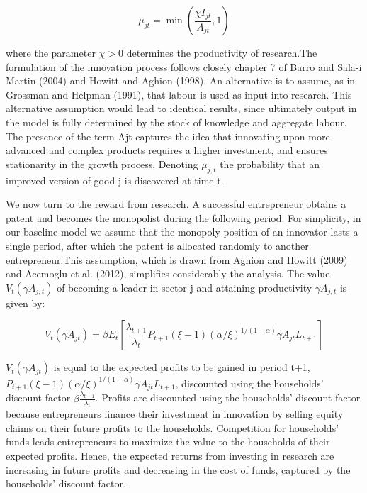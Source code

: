 \documentclass[10pt,math=newtx,citestyle=gb7714-2015,bibstyle=gb7714-2015]{elegantbook}
\begin{document}
{{{	\begin{equation}
		\mu_{j t}=\min \left(\frac{\chi I_{j t}}{A_{j t}}, 1\right)
	\end{equation}
	
	where the parameter $\chi>0$ determines the productivity of research.The formulation of the innovation process follows closely chapter 7 of Barro and Sala-i Martin (2004) and Howitt and Aghion (1998). An alternative is to assume, as in Grossman and Helpman (1991), that labour is used as input into research. This alternative assumption would lead to identical results, since ultimately output in the model is fully determined by the stock of knowledge and aggregate labour. The presence of the term Ajt captures the idea that innovating upon more advanced and complex products requires a higher investment, and ensures stationarity in the growth process. Denoting $\mu_{j,t}$ the probability that an improved version of good j is discovered at time t. 
	
	We now turn to the reward from research. A successful entrepreneur obtains a patent and becomes the monopolist during the following period. For simplicity, in our baseline model we assume that the monopoly position of an innovator lasts a single period, after which the patent is allocated randomly to another entrepreneur.This assumption, which is drawn from Aghion and Howitt (2009) and Acemoglu et al. (2012), simplifies considerably the analysis. The value $V_t (\gamma A_{j,t} )$ of becoming a leader in sector j and attaining productivity $\gamma A_{j,t}$ is given by:

\begin{equation}
	V_{t}\left(\gamma A_{j t}\right)=\beta E_{t}\left[\frac{\lambda_{t+1}}{\lambda_{t}} P_{t+1} (\xi-1)(\alpha / \xi)^{1 /(1-\alpha)} \gamma A_{j t} L_{t+1}\right]
\end{equation}

$V_{t}\left(\gamma A_{j t}\right)$ is equal to the expected profits to be gained in period t+1, $P_{t+1} (\xi-1)(\alpha / \xi)^{1 /(1-\alpha)} \gamma A_{j t} L_{t+1}$, discounted using the households’ discount factor $\beta \frac{\lambda_{t+1}}{\lambda_{t}}$. Profits are discounted using the households’ discount factor because entrepreneurs finance their investment in innovation by selling equity claims on their future profits to the households. Competition for households’ funds leads entrepreneurs to maximize the value to the households of their expected profits. Hence, the expected returns from investing in research are increasing in future profits and decreasing in the cost of funds, captured by the households’ discount factor.

}}}
\end{document}
